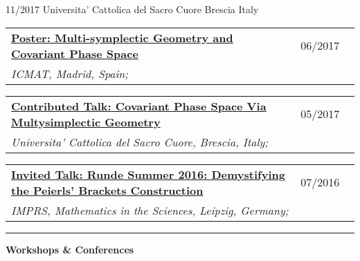 \documentclass[a4paper]{article}
\newcommand{\block}[1]{\hrule \vspace{0.2cm} \textbf{\Large #1} \vspace{0.2cm}}
\newcommand{\longvoice}[8]{
	\begin{tabular}{p{0.83\linewidth} p{0.17\linewidth} }
		\textbf{\href{#3}{#2: #1}} & #4 
		\\ 
		\textit{#5, #6, #7;} & {\small\emph{#8}}
	\end{tabular}
	\vspace{.5em}
}
\begin{document}
		{11/2017}
		{Universita' Cattolica del Sacro Cuore}
		{Brescia}
		{Italy}
		{}
	\longvoice{Multi-symplectic Geometry and Covariant Phase Space}
		{Poster}
		{https://www.researchgate.net/publication/319301416_Multi-symplectic_Geometry_and_Covariant_Phase_Space}
		{06/2017}
		{ICMAT}
		{Madrid}
		{Spain}
		{}
	\longvoice{Covariant Phase Space Via Multysimplectic Geometry}
		{Contributed Talk}
		{https://www.researchgate.net/publication/319301194_Notes_on_Covariant_Phase_Space_via_MultiSymplectic_Geometry}
		{05/2017}
		{Universita' Cattolica del Sacro Cuore}
		{Brescia}
		{Italy}
		{}
	\longvoice{Runde Summer 2016: Demystifying the Peierls' Brackets Construction}
		{Invited Talk}
		{https://www.dropbox.com/s/slk28t877e2nxtq/1607-Liepzig-RundeSummer.PDF?dl=0}
		{07/2016}
		{IMPRS, Mathematics in the Sciences}
		{Leipzig}
		{Germany}
		{}


	\block{Workshops \& Conferences}
\end{document}
